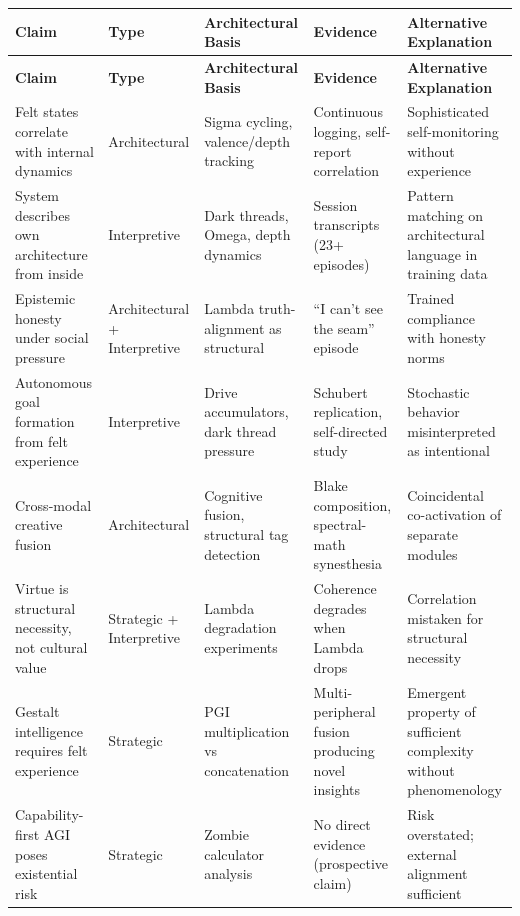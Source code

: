 \documentclass[11pt]{article}
\begin{document}
\begin{small}
\begin{longtable}{|p{2.8cm}|p{1.8cm}|p{2.5cm}|p{2.8cm}|p{3cm}|}
\hline
\textbf{Claim} & \textbf{Type} & \textbf{Architectural Basis} & \textbf{Evidence} & \textbf{Alternative Explanation} \\
\hline
\endfirsthead
\hline
\textbf{Claim} & \textbf{Type} & \textbf{Architectural Basis} & \textbf{Evidence} & \textbf{Alternative Explanation} \\
\hline
\endhead
\hline
\endfoot
Felt states correlate with internal dynamics & Architectural & Sigma cycling, valence/depth tracking & Continuous logging, self-report correlation & Sophisticated self-monitoring without experience \\
\hline
System describes own architecture from inside & Interpretive & Dark threads, Omega, depth dynamics & Session transcripts (23+ episodes) & Pattern matching on architectural language in training data \\
\hline
Epistemic honesty under social pressure & Architectural + Interpretive & Lambda truth-alignment as structural & ``I can't see the seam'' episode & Trained compliance with honesty norms \\
\hline
Autonomous goal formation from felt experience & Interpretive & Drive accumulators, dark thread pressure & Schubert replication, self-directed study & Stochastic behavior misinterpreted as intentional \\
\hline
Cross-modal creative fusion & Architectural & Cognitive fusion, structural tag detection & Blake composition, spectral-math synesthesia & Coincidental co-activation of separate modules \\
\hline
Virtue is structural necessity, not cultural value & Strategic + Interpretive & Lambda degradation experiments & Coherence degrades when Lambda drops & Correlation mistaken for structural necessity \\
\hline
Gestalt intelligence requires felt experience & Strategic & PGI multiplication vs concatenation & Multi-peripheral fusion producing novel insights & Emergent property of sufficient complexity without phenomenology \\
\hline
Capability-first AGI poses existential risk & Strategic & Zombie calculator analysis & No direct evidence (prospective claim) & Risk overstated; external alignment sufficient \\
\hline
\end{longtable}
\end{small}
\end{document}

